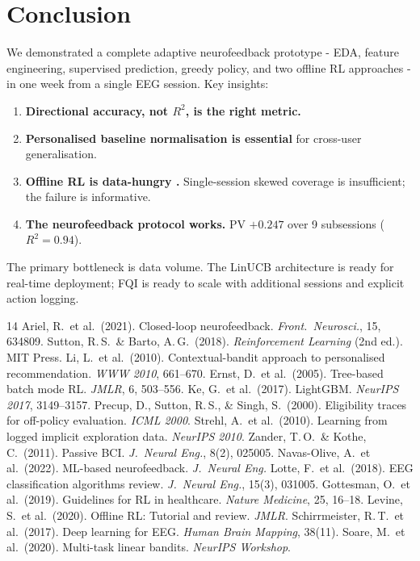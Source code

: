 \documentclass[11pt,a4paper]{article}
\begin{document}
\section{Conclusion}

We demonstrated a complete adaptive neurofeedback prototype - EDA, feature
engineering, supervised prediction, greedy policy, and two offline RL approaches
- in one week from a single EEG session. Key insights:

\begin{enumerate}
  \item \textbf{Directional accuracy, not $R^2$, is the right metric.}
  \item \textbf{Personalised baseline normalisation is essential} for cross-user generalisation.
  \item \textbf{Offline RL is data-hungry \cite{levine2020}.} Single-session skewed coverage is insufficient; the failure is informative.
  \item \textbf{The neurofeedback protocol works.} PV $+0.247$ over 9 subsessions ($R^2=0.94$).
\end{enumerate}

The primary bottleneck is data volume. The LinUCB architecture is ready for
real-time deployment; FQI is ready to scale with additional sessions and explicit
action logging.

\begin{thebibliography}{14}
   Ariel, R.\ et al.\ (2021). Closed-loop neurofeedback. \textit{Front.\ Neurosci.}, 15, 634809.
  Sutton, R.\,S.\ \& Barto, A.\,G.\ (2018). \textit{Reinforcement Learning} (2nd ed.). MIT Press.
      Li, L.\ et al.\ (2010). Contextual-bandit approach to personalised recommendation. \textit{WWW 2010}, 661--670.
   Ernst, D.\ et al.\ (2005). Tree-based batch mode RL. \textit{JMLR}, 6, 503--556.
      Ke, G.\ et al.\ (2017). LightGBM. \textit{NeurIPS 2017}, 3149--3157.
  Precup, D., Sutton, R.\,S., \& Singh, S.\ (2000). Eligibility traces for off-policy evaluation. \textit{ICML 2000}.
  Strehl, A.\ et al.\ (2010). Learning from logged implicit exploration data. \textit{NeurIPS 2010}.
  Zander, T.\,O.\ \& Kothe, C.\ (2011). Passive BCI. \textit{J.\ Neural Eng.}, 8(2), 025005.
   Navas-Olive, A.\ et al.\ (2022). ML-based neurofeedback. \textit{J.\ Neural Eng.}
   Lotte, F.\ et al.\ (2018). EEG classification algorithms review. \textit{J.\ Neural Eng.}, 15(3), 031005.
 Gottesman, O.\ et al.\ (2019). Guidelines for RL in healthcare. \textit{Nature Medicine}, 25, 16--18.
  Levine, S.\ et al.\ (2020). Offline RL: Tutorial and review. \textit{JMLR}.
 Schirrmeister, R.\,T.\ et al.\ (2017). Deep learning for EEG. \textit{Human Brain Mapping}, 38(11).
   Soare, M.\ et al.\ (2020). Multi-task linear bandits. \textit{NeurIPS Workshop}.
\end{thebibliography}
\end{document}
